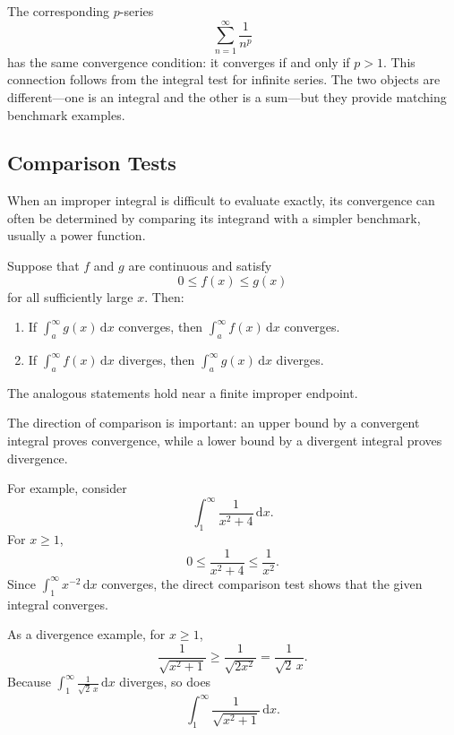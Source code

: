The corresponding \(p\)-series
\[
    \sum_{n=1}^{\infty}\frac{1}{n^p}
\]
has the same convergence condition: it converges if and only if \(p>1\).
This connection follows from the integral test for infinite series.  The two
objects are different---one is an integral and the other is a sum---but they
provide matching benchmark examples.

\subsection{Comparison Tests}

When an improper integral is difficult to evaluate exactly, its convergence
can often be determined by comparing its integrand with a simpler benchmark,
usually a power function.

\begin{theorem}
    Suppose that \(f\) and \(g\) are continuous and satisfy
    \[
        0\leq f(x)\leq g(x)
    \]
    for all sufficiently large \(x\).  Then:
    \begin{enumerate}
        \item If \(\int_a^\infty g(x)\,\mathrm{d}x\) converges, then
        \(\int_a^\infty f(x)\,\mathrm{d}x\) converges.
        \item If \(\int_a^\infty f(x)\,\mathrm{d}x\) diverges, then
        \(\int_a^\infty g(x)\,\mathrm{d}x\) diverges.
    \end{enumerate}
    The analogous statements hold near a finite improper endpoint.
\end{theorem}

The direction of comparison is important: an upper bound by a convergent
integral proves convergence, while a lower bound by a divergent integral
proves divergence.

For example, consider
\[
    \int_1^\infty\frac{1}{x^2+4}\,\mathrm{d}x.
\]
For \(x\geq1\),
\[
    0\leq\frac{1}{x^2+4}\leq\frac{1}{x^2}.
\]
Since \(\int_1^\infty x^{-2}\,\mathrm{d}x\) converges, the direct
comparison test shows that the given integral converges.

As a divergence example, for \(x\geq1\),
\[
    \frac{1}{\sqrt{x^2+1}}
    \geq\frac{1}{\sqrt{2x^2}}
    =\frac{1}{\sqrt2\,x}.
\]
Because \(\int_1^\infty\frac{1}{\sqrt2\,x}\,\mathrm{d}x\) diverges, so
does
\[
    \int_1^\infty\frac{1}{\sqrt{x^2+1}}\,\mathrm{d}x.
\]

